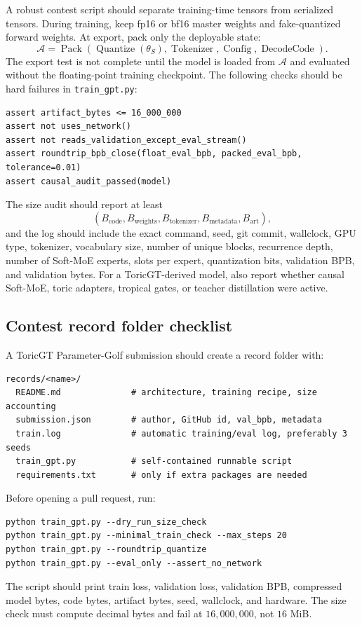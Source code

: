 \documentclass[11pt]{article}
\theoremstyle{definition}
\theoremstyle{plain}
\theoremstyle{remark}
\numberwithin{equation}{section}
\begin{document}
A robust contest script should separate training-time tensors from serialized tensors.  During training, keep fp16 or bf16 master weights and fake-quantized forward weights.  At export, pack only the deployable state:
\begin{equation}
  \mathcal A=\operatorname{Pack}\left(\operatorname{Quantize}(\theta_S),\operatorname{Tokenizer},\operatorname{Config},\operatorname{DecodeCode}\right).
\end{equation}
The export test is not complete until the model is loaded from $\mathcal A$ and evaluated without the floating-point training checkpoint.  The following checks should be hard failures in \texttt{train\_gpt.py}:
\begin{verbatim}
assert artifact_bytes <= 16_000_000
assert not uses_network()
assert not reads_validation_except_eval_stream()
assert roundtrip_bpb_close(float_eval_bpb, packed_eval_bpb, tolerance=0.01)
assert causal_audit_passed(model)
\end{verbatim}
The size audit should report at least
\begin{equation}
  (B_{\mathrm{code}},B_{\mathrm{weights}},B_{\mathrm{tokenizer}},B_{\mathrm{metadata}},B_{\mathrm{art}}),
\end{equation}
and the log should include the exact command, seed, git commit, wallclock, GPU type, tokenizer, vocabulary size, number of unique blocks, recurrence depth, number of Soft-MoE experts, slots per expert, quantization bits, validation BPB, and validation bytes.  For a ToricGT-derived model, also report whether causal Soft-MoE, toric adapters, tropical gates, or teacher distillation were active.

\subsection{Contest record folder checklist}

A ToricGT Parameter-Golf submission should create a record folder with:
\begin{verbatim}
records/<name>/
  README.md              # architecture, training recipe, size accounting
  submission.json        # author, GitHub id, val_bpb, metadata
  train.log              # automatic training/eval log, preferably 3 seeds
  train_gpt.py           # self-contained runnable script
  requirements.txt       # only if extra packages are needed
\end{verbatim}
Before opening a pull request, run:
\begin{verbatim}
python train_gpt.py --dry_run_size_check
python train_gpt.py --minimal_train_check --max_steps 20
python train_gpt.py --roundtrip_quantize
python train_gpt.py --eval_only --assert_no_network
\end{verbatim}
The script should print train loss, validation loss, validation BPB, compressed model bytes, code bytes, artifact bytes, seed, wallclock, and hardware.  The size check must compute decimal bytes and fail at $16{,}000{,}000$, not $16$ MiB.
\end{document}
